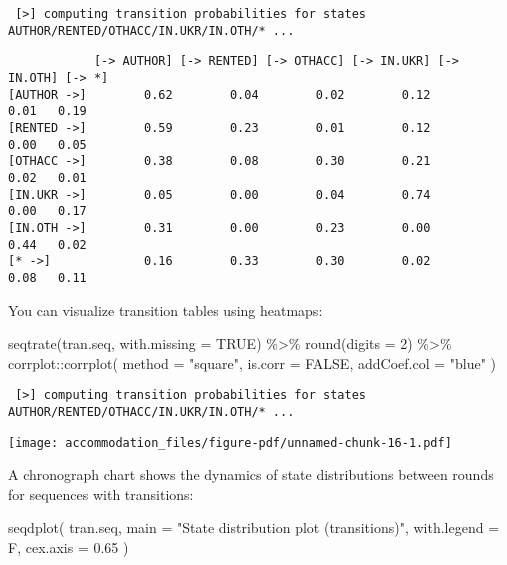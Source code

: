 \documentclass[
  letterpaper,
  DIV=11,
  numbers=noendperiod]{scrreprt}
\newenvironment{Shaded}{\begin{snugshade}}{\end{snugshade}}
\newcommand{\AttributeTok}[1]{\textcolor[rgb]{0.40,0.45,0.13}{#1}}
\newcommand{\ConstantTok}[1]{\textcolor[rgb]{0.56,0.35,0.01}{#1}}
\newcommand{\DecValTok}[1]{\textcolor[rgb]{0.68,0.00,0.00}{#1}}
\newcommand{\FloatTok}[1]{\textcolor[rgb]{0.68,0.00,0.00}{#1}}
\newcommand{\FunctionTok}[1]{\textcolor[rgb]{0.28,0.35,0.67}{#1}}
\newcommand{\NormalTok}[1]{\textcolor[rgb]{0.00,0.23,0.31}{#1}}
\newcommand{\SpecialCharTok}[1]{\textcolor[rgb]{0.37,0.37,0.37}{#1}}
\newcommand{\StringTok}[1]{\textcolor[rgb]{0.13,0.47,0.30}{#1}}
\begin{document}
\begin{verbatim}
 [>] computing transition probabilities for states AUTHOR/RENTED/OTHACC/IN.UKR/IN.OTH/* ...
\end{verbatim}

\begin{verbatim}
            [-> AUTHOR] [-> RENTED] [-> OTHACC] [-> IN.UKR] [-> IN.OTH] [-> *]
[AUTHOR ->]        0.62        0.04        0.02        0.12        0.01   0.19
[RENTED ->]        0.59        0.23        0.01        0.12        0.00   0.05
[OTHACC ->]        0.38        0.08        0.30        0.21        0.02   0.01
[IN.UKR ->]        0.05        0.00        0.04        0.74        0.00   0.17
[IN.OTH ->]        0.31        0.00        0.23        0.00        0.44   0.02
[* ->]             0.16        0.33        0.30        0.02        0.08   0.11
\end{verbatim}

You can visualize transition tables using heatmaps:

\begin{Shaded}
\begin{Highlighting}[]
\FunctionTok{seqtrate}\NormalTok{(tran.seq, }\AttributeTok{with.missing =} \ConstantTok{TRUE}\NormalTok{) }\SpecialCharTok{\%\textgreater{}\%} 
  \FunctionTok{round}\NormalTok{(}\AttributeTok{digits =} \DecValTok{2}\NormalTok{) }\SpecialCharTok{\%\textgreater{}\%} 
\NormalTok{  corrplot}\SpecialCharTok{::}\FunctionTok{corrplot}\NormalTok{(}
    \AttributeTok{method =} \StringTok{"square"}\NormalTok{, }\AttributeTok{is.corr =} \ConstantTok{FALSE}\NormalTok{, }\AttributeTok{addCoef.col =} \StringTok{"blue"}
\NormalTok{  )}
\end{Highlighting}
\end{Shaded}

\begin{verbatim}
 [>] computing transition probabilities for states AUTHOR/RENTED/OTHACC/IN.UKR/IN.OTH/* ...
\end{verbatim}

\texttt{[image: accommodation\_files/figure-pdf/unnamed-chunk-16-1.pdf]}

A chronograph chart shows the dynamics of state distributions between
rounds for sequences with transitions:

\begin{Shaded}
\begin{Highlighting}[]
\FunctionTok{seqdplot}\NormalTok{(}
\NormalTok{  tran.seq, }\AttributeTok{main =} \StringTok{"State distribution plot (transitions)"}\NormalTok{,}
  \AttributeTok{with.legend =}\NormalTok{ F, }\AttributeTok{cex.axis =} \FloatTok{0.65}
\NormalTok{)}
\end{Highlighting}
\end{Shaded}
\end{document}
